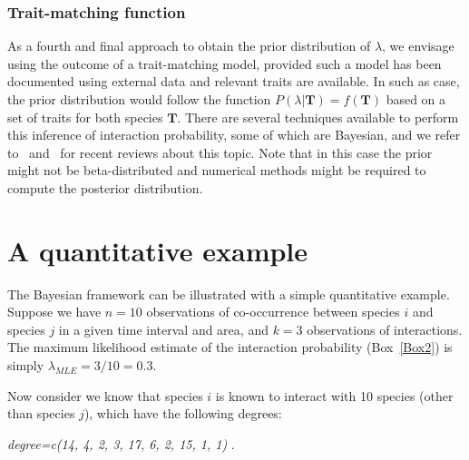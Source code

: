 \documentclass[12pt]{article}
\begin{document}
\begin{spacing}{2.0}
      \subsubsection*{Trait-matching function} 


          As a fourth and final approach to obtain the prior distribution of $\lambda$, we envisage using the outcome of a trait-matching model, provided such a model has been documented using external data and relevant traits are available. 
          In such as case, the prior distribution would follow the function $P(\lambda|\mathbf{T})=f(\mathbf{T})$ based on a set of traits for both species $\mathbf{T}$. There are several techniques available to perform this inference of interaction probability, some of which are Bayesian, and we refer to~\citet{Bartomeus2016} and~\citet{Weinstein2017} for recent reviews about this topic. Note that in this case the prior might not be beta-distributed and numerical methods might be required to compute the posterior distribution.  


\section*{A quantitative example}

  The Bayesian framework can be illustrated with a simple quantitative example. Suppose we have $n = 10$ observations of co-occurrence between species $i$ and species $j$ in a given time interval and area, and $k = 3$ observations of interactions. The maximum likelihood estimate of the interaction probability (Box~\ref{Box2}) is simply $\lambda_{MLE} = 3/10 = 0.3$. 
  

  Now consider we know that species $i$ is known to interact with 10 species (other than species $j$), which have the following degrees:

    \vspace{12pt}
    \noindent\emph{
      degree=c(14, 4, 2, 3, 17, 6, 2, 15, 1, 1)
        }.
      \vspace{12pt}


\end{spacing}
\end{document}
